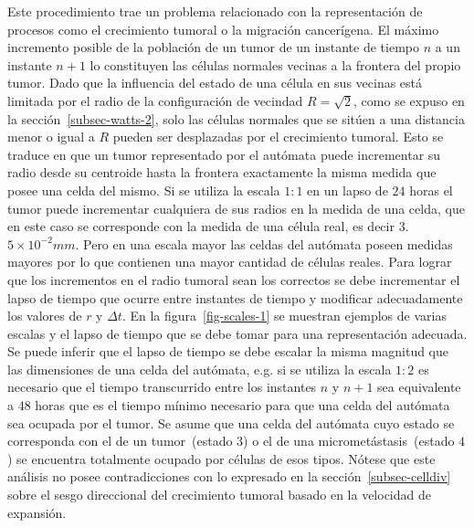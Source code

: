Este procedimiento trae un problema relacionado con la representaci\'on de procesos como el crecimiento tumoral o la migraci\'on cancer\'igena. El m\'aximo incremento posible de la poblaci\'on de un tumor de un instante de tiempo $n$ a un instante $n+1$ lo constituyen las c\'elulas normales vecinas a la frontera del propio tumor. Dado que la influencia del estado de una c\'elula en sus vecinas est\'a limitada por el radio de la configuraci\'on de vecindad $R=\sqrt{2}$, como se expuso en la secci\'on~\ref{subsec-watts-2}, solo las c\'elulas normales que se sit\'uen a una distancia menor o igual a $R$ pueden ser desplazadas por el crecimiento tumoral. Esto se traduce en que un tumor representado por el aut\'omata puede incrementar su radio desde su centroide hasta la frontera exactamente la misma medida que posee una celda del mismo. Si se utiliza la escala $1:1$ en un lapso de $24$ horas el tumor puede incrementar cualquiera de sus radios en la medida de una celda, que en este caso se corresponde con la medida de una c\'elula real, es decir $3$.$5 \times 10^{-2}mm$. Pero en una escala mayor las celdas del aut\'omata poseen medidas mayores por lo que contienen una mayor cantidad de c\'elulas reales. Para lograr que los incrementos en el radio tumoral sean los correctos se debe incrementar el lapso de tiempo que ocurre entre instantes de tiempo y modificar adecuadamente los valores de $r$ y $\Delta t$. En la figura~\ref{fig-scales-1} se muestran ejemplos de varias escalas y el lapso de tiempo que se debe tomar para una representaci\'on adecuada. Se puede inferir que el lapso de tiempo se debe escalar la misma magnitud que las dimensiones de una celda del aut\'omata, e.g. si se utiliza la escala $1:2$ es necesario que el tiempo transcurrido entre los instantes $n$ y $n+1$ sea equivalente a $48$ horas que es el tiempo m\'inimo necesario para que una celda del aut\'omata sea ocupada por el tumor. Se asume que una celda del aut\'omata cuyo estado se corresponda con el de un tumor~(estado $3$) o el de una micromet\'astasis~(estado $4$) se encuentra totalmente ocupado por c\'elulas de esos tipos. N\'otese que este an\'alisis no posee contradicciones con lo expresado en la secci\'on~\ref{subsec-celldiv} sobre el sesgo direccional del crecimiento tumoral basado en la velocidad de expansi\'on.

